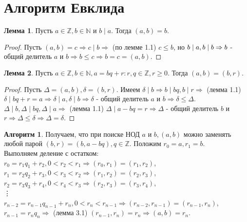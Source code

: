 \documentclass[a4paper, 12pt]{article}
\newcommand{\N}{\mathbb{N}}
\newcommand{\Z}{\mathbb{Z}}
\renewcommand{\div}{\mid}
\theoremstyle{definition}
\newtheorem{lemma}{Лемма}[section]
\newtheorem*{algorithm}{Алгоритм}
\begin{document}
    \section{Алгоритм Евклида}
    \begin{lemma}
        Пусть $a\in \Z, b\in \N$ и $b \mid a$. Тогда $(a,b)=b$.
    \end{lemma}
    \begin{proof}
        Пусть $(a,b)=c\Rightarrow c\mid b \Rightarrow$ (по лемме 1.1) $c\leq b$, но $b\mid a,\\ b\mid b\Rightarrow b$ - общий делитель $a$ и $b\Rightarrow b\leq c\Rightarrow b=c=(a,b)$.
    \end{proof} 
    \begin{lemma}
        Пусть $a\in \Z, b\in \N, a=bq+r: r,q\in \Z, r\geq 0$. Тогда $(a,b)=(b,r)$. 
    \end{lemma} 
    \begin{proof}
        Пусть $\Delta=(a,b), \delta=(b,r)$. Имеем $\delta \div b \Rightarrow b\div bq, b\div r\Rightarrow$ (лемма 1.1) $\delta \div bq+r=a\Rightarrow \delta \div a,\delta \div b\Rightarrow \delta$ - общий делитель $a$ и $b \Rightarrow \delta\leq \Delta$. \\ $\Delta \div b, \Delta \div bq, \Delta \div a\Rightarrow$ (лемма 1.1) $\Delta \div a-bq=r\Rightarrow \Delta$ - общий делитель $b$ и $r\Rightarrow \Delta \leq \delta \Rightarrow \Delta = \delta$.
    \end{proof} 
    \begin{algorithm}
        Получаем, что при поиске НОД $a$ и $b, (a,b)$ можно заменять любой парой $(b,r)=(b,a-bq), q\in \Z$. Положим $r_0=a, r_1=b$. \\ 
        Выполняем деление с остатком:\\
        $r_0=r_1q_1+r_2, 0<r_2<r_1\Rightarrow (r_0, r_1)=(r_1,r_2)$,\\
        $r_1=r_2q_2+r_3, 0<r_3<r_2\Rightarrow (r_1, r_2)=(r_2,r_3)$,\\
        $r_2=r_3q_3+r_4, 0<r_4<r_3\Rightarrow (r_2, r_3)=(r_3,r_4)$,\\
        \vdots \\
        $r_{n-2}=r_{n-1}q_{n-1}+r_n, 0<r_n<r_{n-1}\Rightarrow (r_{n-2}, r_{n-1})=(r_{n-1},r_n)$, \\
        $r_{n-1}=r_nq_n \Rightarrow$ (лемма 3.1) $(r_{n-1},r_n)=r_n\Rightarrow (a,b)=r_n$.
    \end{algorithm}
\end{document}
